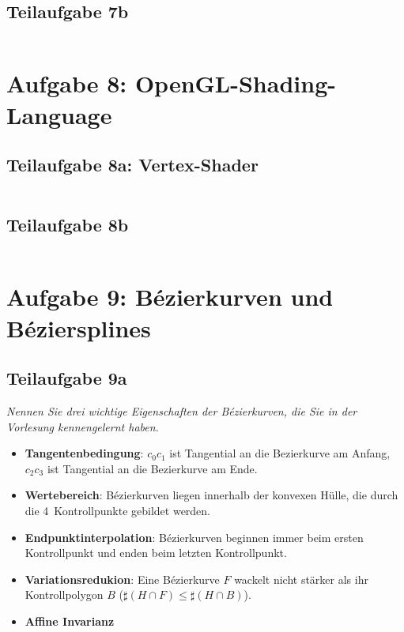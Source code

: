 \documentclass[a4paper]{scrartcl}
\begin{document}
\subsection*{Teilaufgabe 7b}
\inputminted[linenos, numbersep=5pt, tabsize=4, frame=lines, label=7b.cpp]{cpp}{7b.cpp}

\section*{Aufgabe 8: OpenGL-Shading-Language}
\subsection*{Teilaufgabe 8a: Vertex-Shader}
\inputminted[linenos, numbersep=5pt, tabsize=4, frame=lines, label=shader8a.vert]{glsl}{shader8a.vert}

\clearpage
\subsection*{Teilaufgabe 8b}
\inputminted[linenos, numbersep=5pt, tabsize=4, frame=lines, label=shader8b.frag]{glsl}{shader8b.frag}

\clearpage
\section*{Aufgabe 9: Bézierkurven und Béziersplines}
\subsection*{Teilaufgabe 9a}
\textit{Nennen Sie drei wichtige Eigenschaften der Bézierkurven, die Sie in der Vorlesung
kennengelernt haben.}

\begin{itemize}
    \item \textbf{Tangentenbedingung}:
          $c_0 c_1$ ist Tangential an die Bezierkurve am Anfang,
          $c_2 c_3$ ist Tangential an die Bezierkurve am Ende.
    \item \textbf{Wertebereich}: Bézierkurven liegen innerhalb der konvexen
          Hülle, die durch die 4~Kontrollpunkte gebildet werden.
    \item \textbf{Endpunktinterpolation}: Bézierkurven beginnen immer beim
          ersten Kontrollpunkt und enden beim letzten Kontrollpunkt.
    \item \textbf{Variationsredukion}: Eine Bézierkurve $F$ wackelt nicht stärker
          als ihr Kontrollpolygon $B$ ($\sharp (H \cap F) \leq \sharp (H \cap B)$).
    \item \textbf{Affine Invarianz}
\end{itemize}
\end{document}
